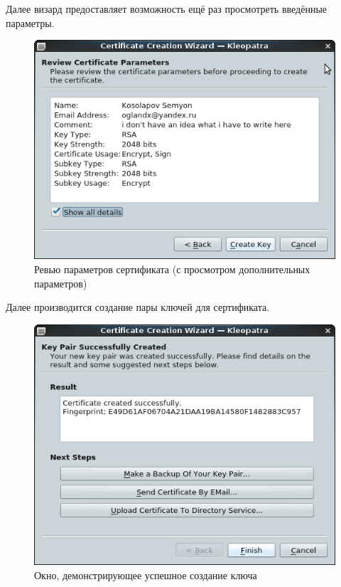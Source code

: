 \documentclass[a4paper]{article}
\begin{document}
Далее визард предоставляет возможность ещё раз просмотреть введённые параметры.

\begin{figure}[H]
	\begin{center}
		\includegraphics[scale=0.5]{pics/Screenshot at 2016-04-18 00:41:00.png}
		\caption{Ревью параметров сертификата (с просмотром дополнительных параметров)} 
		\label{pic:pic_name} %
	\end{center}
\end{figure}

Далее производится создание пары ключей для сертификата. 

\begin{figure}[H]
	\begin{center}
		\includegraphics[scale=0.5]{pics/Screenshot at 2016-04-18 00:44:47.png}
		\caption{Окно, демонстрирующее успешное создание ключа} 
		\label{pic:pic_name} %
	\end{center}
\end{figure}
\end{document}
